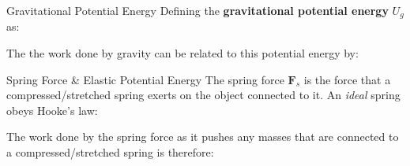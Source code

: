 \documentclass[12pt,compress,aspectratio=169]{beamer}
\begin{document}
\begin{frame}{Gravitational Potential Energy}
  Defining the \textbf{gravitational potential energy} $U_g$ as:


  The the work done by gravity can be related to this potential energy by:
  

\end{frame}




\begin{frame}{Spring Force \& Elastic Potential Energy}
  The spring force $\bm F_s$ is the force that a compressed/stretched spring
  exerts on the object connected to it. An \emph{ideal} spring obeys Hooke's
  law:
  

  \vspace{-.15in}The work done by the spring force as it pushes any masses that
  are connected to a compressed/stretched spring is therefore:

\end{frame}
\end{document}
